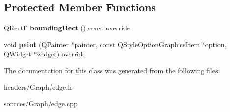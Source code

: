 \subsection*{Protected Member Functions}
\begin{DoxyCompactItemize}
\item 
\mbox{\label{class_edge_a414eb7f63b639f571e71f1e42198a795}} 
Q\+RectF {\bfseries bounding\+Rect} () const override
\item 
\mbox{\label{class_edge_a5ac25b0482fff6c68924031695fe4da7}} 
void {\bfseries paint} (Q\+Painter $\ast$painter, const Q\+Style\+Option\+Graphics\+Item $\ast$option, Q\+Widget $\ast$widget) override
\end{DoxyCompactItemize}


The documentation for this class was generated from the following files\+:\begin{DoxyCompactItemize}
\item 
headers/\+Graph/edge.\+h\item 
sources/\+Graph/edge.\+cpp\end{DoxyCompactItemize}
